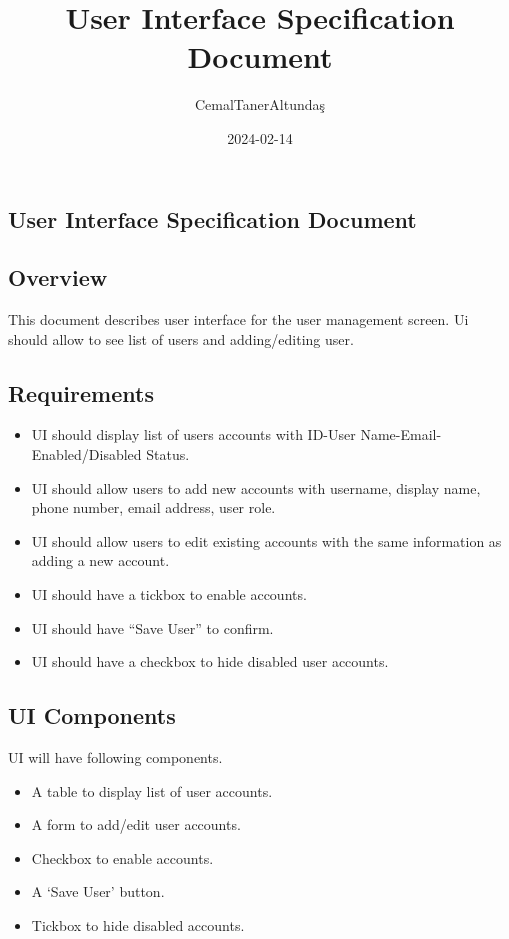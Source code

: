 \documentclass[
]{article}
\title{User Interface Specification Document}
\author{CemalTanerAltundaş}
\date{2024-02-14}
\begin{document}
\maketitle

\hypertarget{user-interface-specification-document}{%
\subsection{User Interface Specification
Document}\label{user-interface-specification-document}}

\hypertarget{overview}{%
\subsection{Overview}\label{overview}}

This document describes user interface for the user management screen.
Ui should allow to see list of users and adding/editing user.

\hypertarget{requirements}{%
\subsection{Requirements}\label{requirements}}

\begin{itemize}
\item
  UI should display list of users accounts with ID-User
  Name-Email-Enabled/Disabled Status.
\item
  UI should allow users to add new accounts with username, display name,
  phone number, email address, user role.
\item
  UI should allow users to edit existing accounts with the same
  information as adding a new account.
\item
  UI should have a tickbox to enable accounts.
\item
  UI should have ``Save User'' to confirm.
\item
  UI should have a checkbox to hide disabled user accounts.
\end{itemize}

\hypertarget{ui-components}{%
\subsection{UI Components}\label{ui-components}}

UI will have following components.

\begin{itemize}
\item
  A table to display list of user accounts.
\item
  A form to add/edit user accounts.
\item
  Checkbox to enable accounts.
\item
  A `Save User' button.
\item
  Tickbox to hide disabled accounts.
\end{itemize}
\end{document}
